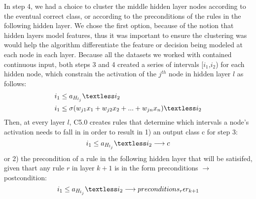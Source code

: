 In step 4, we had a choice to cluster the middle hidden layer nodes
according to the eventual correct class, or according to the
preconditions of the rules in the following hidden layer. We chose the
first option, because of the notion that hidden layers model features,
thus it was important to ensure the clustering was would help the
algorithm differentiate the feature or decision being modeled at each
node in each layer. Because all the datasets we worked with contained
continuous input, both steps 3 and 4 created a series of intervals [$i_1$,$i_2$) for
each hidden node, which constrain the activation of the $j^{th}$ node in hidden
layer $l$ as follows:
\begin{equation}
  \begin{split}
    &i_1 \le a_{H_{l_j}} \textless i_2 \\
    &i_1 \le \sigma(w_{j1}x_1 + w_{j2}x_2 + ... + w_{jn}x_n)  \textless i_2
  \end{split}
\end{equation}
Then, at every layer $l$, C5.0 creates rules that determine which intervals a node's
activation needs to fall in in order to result in 1) an output class c
for step 3:
\begin{equation}
  i_1 \le a_{H_{l_j}} \textless i_2  \longrightarrow  c
\end{equation}
or 2) the precondition of a rule in the following hidden layer that
will be satisifed, given thart any rule $r$ in layer $k + 1$ is in the form preconditions
$\longrightarrow$ postcondition:
\begin{equation}
  i_1 \le a_{H_{l_j}}  \textless i_2  \longrightarrow preconditions_r \epsilon r_{k+1}
\end{equation}

